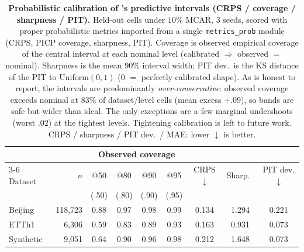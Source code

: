 \begin{table}[tbp]\centering\small
\setlength{\tabcolsep}{4pt}
\caption{\textbf{Probabilistic calibration of \cafe{}'s predictive intervals (CRPS / coverage / sharpness / PIT).} Held-out cells under $10\%$ MCAR, 3 seeds, scored with proper probabilistic metrics imported from a single \texttt{metrics\_prob} module (CRPS, PICP coverage, sharpness, PIT). Coverage is observed empirical coverage of the central interval at each nominal level (calibrated $\Rightarrow$ observed $=$ nominal). Sharpness is the mean $90\%$ interval width; PIT dev.\ is the KS distance of the PIT to Uniform$(0,1)$ ($0$ $=$ perfectly calibrated shape). As is honest to report, the intervals are predominantly \emph{over-conservative}: observed coverage exceeds nominal at 83\% of dataset/level cells (mean excess $+.09$), so bands are safe but wider than ideal. The only exceptions are a few marginal undershoots (worst $.02$) at the tightest levels. Tightening calibration is left to future work. CRPS / sharpness / PIT dev.\ / MAE: lower $\downarrow$ is better.}
\label{tab:calibcrps}
\begin{tabular}{@{}lrccccccc@{}}
\toprule
& & \multicolumn{4}{c}{Observed coverage} & & & \\
\cmidrule(lr){3-6}
Dataset & $n$ & @50 & @80 & @90 & @95 & CRPS$\downarrow$ & Sharp.\ & PIT dev.$\downarrow$ \\
& & \scriptsize(.50) & \scriptsize(.80) & \scriptsize(.90) & \scriptsize(.95) & & & \\
\midrule
Beijing & 118{,}723 & 0.88 & 0.97 & 0.98 & 0.99 & 0.134 & 1.294 & 0.221 \\
ETTh1 & 6{,}306 & 0.59 & 0.83 & 0.89 & 0.93 & 0.163 & 0.931 & 0.073 \\
Synthetic & 9{,}051 & 0.64 & 0.90 & 0.96 & 0.98 & 0.212 & 1.648 & 0.073 \\
\bottomrule
\end{tabular}
\end{table}
